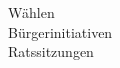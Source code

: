 \documentclass[preview]{standalone}
\begin{document}
Wählen\\Bürgerinitiativen\\Ratssitzungen\\
\end{document}
